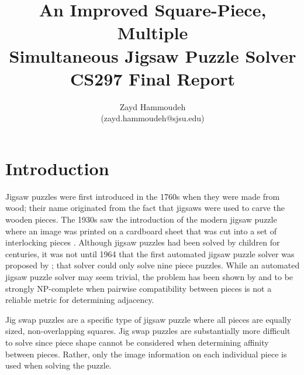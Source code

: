 \documentclass{report}
\title{   An Improved Square-Piece, Multiple
       \\ Simultaneous Jigsaw Puzzle Solver
       \\[1in]
	   CS297 Final Report}
\author{
  Zayd Hammoudeh \\
  (zayd.hammoudeh@sjsu.edu)
  }
\begin{document}
\maketitle


\renewcommand{\contentsname}{Table of Contents} %
\tableofcontents{\protect\newpage}

\listoffigures
\newpage

\listoftables
\newpage
 

\renewcommand\thesection{\arabic{section}}






\section{Introduction}\label{sec:introduction}

Jigsaw puzzles were first introduced in the 1760s when they were made from wood; their name originated from the fact that jigsaws were used to carve the wooden pieces.   The 1930s saw the introduction of the modern jigsaw puzzle where an image was printed on a cardboard sheet that was cut into a set of interlocking pieces \cite{williams1990, williams2004}.  Although jigsaw puzzles had been solved by children for centuries, it was not until 1964 that the first automated jigsaw puzzle solver was proposed by \cite{freeman1964}; that solver could only solve nine piece puzzles.  While an automated jigsaw puzzle solver may seem trivial, the problem has been shown by \cite{altman1990} and \cite{demaine2007} to be strongly NP-complete when pairwise compatibility between pieces is not a reliable metric for determining adjacency.

Jig swap puzzles are a specific type of jigsaw puzzle where all pieces are equally sized, non-overlapping squares.  Jig swap puzzles are substantially more difficult to solve since piece shape cannot be considered when determining affinity between pieces.  Rather, only the image information on each individual piece is used when solving the puzzle.  
\end{document}
